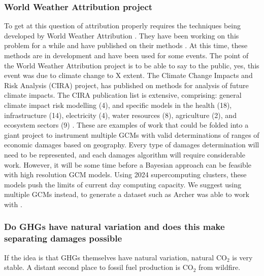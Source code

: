 \documentclass{article}
\begin{document}
\subsubsection{World Weather Attribution project}
\label{WorldWeatherAttribution}
To get at this question of attribution properly requires the techniques being developed by World Weather Attribution \cite{WorldWeatherAttribution2024}. They have been working on this problem for a while and have published on their methods \cite{Haustein2017ARealTimeGlobalWarmingIndex_WeatherAttribution,Philip2020AprotocolForProbabilisticExtremeEventAttributionAnalyses,vanOldenborgh2021PathwaysAndPitfallsInExtremeEventAttribution,vanOldenborgh2022AttributingandProjectingHeatwavesIsHardWeCanDoBetter,Friederike2022HowtoProvideUsefulAttributionStatementsLessonsLearnedfromOperationalizingEventAttributioninEurope,ZACHARIAH2023Attributionofthe2015DroughtInMarathwadaIndiaFromAMultivariatePerspective}. At this time, these methods are in development and have been used for some events. The point of the World Weather Attribution project is to be able to say to the public, yes, this event was due to climate change to X extent.  The Climate Change Impacts and Risk Analysis (CIRA) project, has published on methods for analysis of future climate impacts. The CIRA publication list is extensive, comprising: general climate impact risk modelling (4), and specific models in the health (18), infrastructure (14), electricity (4), water resources (8), agriculture (2), and ecosystem sectors (9) \cite{CIRA2024CIRAjournalPubs}. These are examples of work that could be folded into a giant project to instrument multiple GCMs with valid determinations of ranges of economic damages based on geography.  Every type of damages determination will need to be represented, and each damages algorithm will require considerable work. However, it will be some time before a Bayesian approach can be feasible with high resolution GCM models. Using 2024 supercomputing clusters, these models push the limits of current day computing capacity. We suggest using multiple GCMs instead, to generate a dataset such as Archer was able to work with \cite{Archer2009AtmosphericLifetimeOfCO2}. 

\subsubsection{Do GHGs have natural variation and does this make separating damages possible}
If the idea is that GHGs themselves have natural variation, natural CO$_2$ is very stable. A distant second place to fossil fuel production is CO$_2$ from wildfire. 
\end{document}
